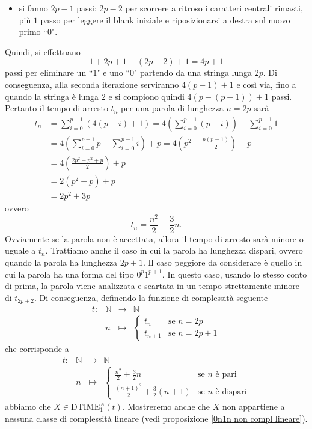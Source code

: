 \begin{exam}
\begin{itemize}
    \item si fanno $2p-1$ passi: $2p-2$ per scorrere a ritroso i caratteri centrali rimasti, più $1$ passo per leggere il blank iniziale e riposizionarsi a destra sul nuovo primo ``$0$".
\end{itemize}
Quindi, si effettuano
\[1 + 2p + 1 + (2p - 2) + 1 = 4p + 1\]
passi per eliminare un ``$1$" e uno ``$0$" partendo da una stringa lunga $2p$.
Di conseguenza, alla seconda iterazione serviranno $4(p-1) + 1$
e così via, fino a quando la stringa è lunga $2$ e si compiono quindi $4(p-(p-1))+1$ passi. 
Pertanto il tempo di arresto $t_n$ per una parola di lunghezza $n = 2p$ sarà
\begin{align*}
t_n &= \sum_{i=0}^{p-1} (4(p-i) + 1) 
= 4 \left( \sum_{i=0}^{p-1} (p-i) \right) + \sum_{i=0}^{p-1} 1 
\\&=
4 \left( \sum_{i=0}^{p-1} p -\sum_{i=0}^{p-1} i \right) + p
=
4 \left( p^2 - \frac{p(p-1)}{2}\right) + p
\\&=
4 \left( \frac{2p^2 - p^2 + p}{2}\right) + p
\\&=
2 \left( p^2 + p \right) + p
\\& =2p^2 + 3p
\end{align*}
ovvero
\[t_n = \frac{n^2}{2} + \frac{3}{2}n.\]
Ovviamente se la parola non è accettata, allora il tempo di arresto sarà minore o uguale a $t_n$.
Trattiamo anche il caso in cui la parola ha lunghezza dispari, ovvero quando la parola ha lunghezza $2p+1$. Il caso peggiore da considerare è quello in cui la parola ha una forma del tipo $0^p 1^{p+1}$. 
In questo caso, usando lo stesso conto di prima, la parola viene analizzata e scartata in un tempo strettamente minore di $t_{2p+2}$.
Di conseguenza, definendo la funzione di complessità seguente
\[\begin{matrix}     t: & \mathbb N & \to & \mathbb N     \\     & n & \mapsto &     \begin{cases}         t_{n} & \text{se } n=2p         \\         t_{n+1} & \text{se } n=2p+1     \end{cases} \end{matrix}\]
che corrisponde a
\[\begin{matrix}     t: & \mathbb N & \to & \mathbb N     \\     & n & \mapsto &     \begin{cases}         \frac{n^2}{2} + \frac{3}{2}n & \text{se } n \text{ è pari}         \\         \frac{(n+1)^2}{2} + \frac{3}{2}(n+1)  & \text{se } n \text{ è dispari}     \end{cases} 
\end{matrix}
\]
abbiamo che $X \in \mathrm{DTIME}_1^{A}(t)$.
Mostreremo anche che $X$ non appartiene a nessuna classe
di complessità lineare
(vedi proposizione \ref{0n1n non compl lineare}).
\end{exam}


